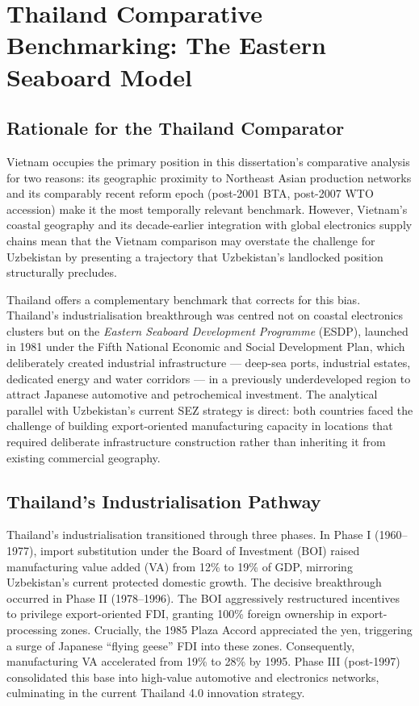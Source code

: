 \section{Thailand Comparative Benchmarking: The Eastern Seaboard Model}
\label{sec:thailand}

\subsection{Rationale for the Thailand Comparator}

Vietnam occupies the primary position in this dissertation's comparative analysis for two reasons: its geographic proximity to Northeast Asian production networks and its comparably recent reform epoch (post-2001 BTA, post-2007 WTO accession) make it the most temporally relevant benchmark. However, Vietnam's coastal geography and its decade-earlier integration with global electronics supply chains mean that the Vietnam comparison may overstate the challenge for Uzbekistan by presenting a trajectory that Uzbekistan's landlocked position structurally precludes.

Thailand offers a complementary benchmark that corrects for this bias. Thailand's industrialisation breakthrough was centred not on coastal electronics clusters but on the \textit{Eastern Seaboard Development Programme} (ESDP), launched in 1981 under the Fifth National Economic and Social Development Plan, which deliberately created industrial infrastructure --- deep-sea ports, industrial estates, dedicated energy and water corridors --- in a previously underdeveloped region to attract Japanese automotive and petrochemical investment. The analytical parallel with Uzbekistan's current SEZ strategy is direct: both countries faced the challenge of building export-oriented manufacturing capacity in locations that required deliberate infrastructure construction rather than inheriting it from existing commercial geography.

\subsection{Thailand's Industrialisation Pathway}

Thailand's industrialisation transitioned through three phases. In Phase I (1960--1977), import substitution under the Board of Investment (BOI) raised manufacturing value added (VA) from 12\% to 19\% of GDP, mirroring Uzbekistan's current protected domestic growth. The decisive breakthrough occurred in Phase II (1978--1996). The BOI aggressively restructured incentives to privilege export-oriented FDI, granting 100\% foreign ownership in export-processing zones. Crucially, the 1985 Plaza Accord appreciated the yen, triggering a surge of Japanese ``flying geese'' FDI into these zones. Consequently, manufacturing VA accelerated from 19\% to 28\% by 1995. Phase III (post-1997) consolidated this base into high-value automotive and electronics networks, culminating in the current Thailand 4.0 innovation strategy.

